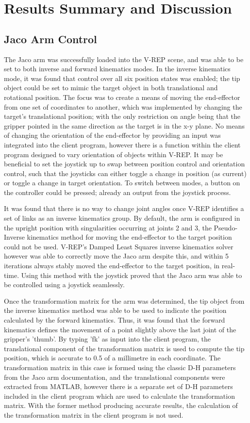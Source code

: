 \documentclass[12pt,openany,a4paper]{book}
\begin{document}
\cleardoublepage

\chapter{Results Summary and Discussion}
\section{Jaco Arm Control}
The Jaco arm was successfully loaded into the V-REP scene, and was able to be set to both inverse and forward kinematics modes. In the inverse kinematics mode, it was found that control over all six position states was enabled; the tip object could be set to mimic the target object in both translational and rotational position. The focus was to create a means of moving the end-effector from one set of coordinates to another, which was implemented by changing the target's translational position; with the only restriction on angle being that the gripper pointed in the same direction as the target is in the x-y plane. No means of changing the orientation of the end-effector by providing an input was integrated into the client program, however there is a function within the client program designed to vary orientation of objects within V-REP. It may be beneficial to set the joystick up to swap between position control and orientation control, such that the joysticks can either toggle a change in position (as current) or toggle a change in target orientation. To switch between modes, a button on the controller could be pressed; already an output from the joystick process.

It was found that there is no way to change joint angles once V-REP identifies a set of links as an inverse kinematics group. By default, the arm is configured in the upright position with singularities occurring at joints 2 and 3, the Pseudo-Inverse kinematics method for moving the end-effector to the target position could not be used. V-REP's Damped Least Squares inverse kinematics solver however was able to correctly move the Jaco arm despite this, and within 5 iterations always stably moved the end-effector to the target position, in real-time. Using this method with the joystick proved that the Jaco arm was able to be controlled using a joystick seamlessly. 

Once the transformation matrix for the arm was determined, the tip object from the inverse kinematics method was able to be used to indicate the position calculated by the forward kinematics. Thus, it was found that the forward kinematics defines the movement of a point slightly above the last joint of the gripper's 'thumb'. By typing 'fk' as input into the client program, the translational component of the transformation matrix is used to compute the tip position, which is accurate to 0.5 of a millimetre in each coordinate. The transformation matrix in this case is formed using the classic D-H parameters from the Jaco arm documentation, and the translational components were extracted from MATLAB, however there is a separate set of D-H parameters included in the client program which are used to calculate the transformation matrix. With the former method producing accurate results, the calculation of the transformation matrix in the client program is not used.
\end{document}
